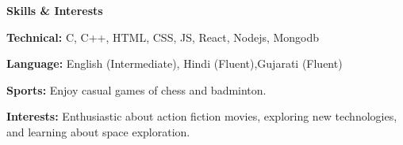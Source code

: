 \documentclass[11pt]{article}
\begin{document}
\vspace{12pt}

\begin{center}
    \textbf{Skills \& Interests }
\end{center}

\textbf{Technical:} C, C++, HTML, CSS, JS, React, Nodejs, Mongodb

\textbf{Language:} English (Intermediate), Hindi (Fluent),Gujarati (Fluent)

\textbf{Sports:} Enjoy casual games of chess and badminton.

\textbf{Interests:} Enthusiastic about action fiction movies, exploring new technologies, and learning about space exploration.
\end{document}
